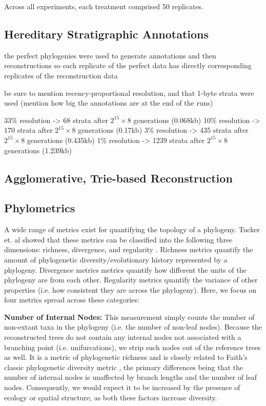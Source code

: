 Across all experiments, each treatment comprised 50 replicates.

\subsection{Hereditary Stratigraphic Annotations}

the perfect phylogenies were used to generate annotations and then reconstructions so each replicate of the perfect data has directly corresponding replicates of the reconstruction data

be sure to mention recency-proportional resolution, and that 1-byte strata were used (mention how big the annotations are at the end of the runs)

33\% resolution -> 68 strata after $2^{15} \times 8$ generations (0.068kb)
10\% resolution -> 170 strata after $2^{15} \times 8$ generations (0.17kb)
3\% resolution -> 435 strata after $2^{15} \times 8$ generations (0.435kb)
1\% resolution -> 1239 strata after $2^{15} \times 8$ generations (1.239kb)


\subsection{Agglomerative, Trie-based Reconstruction}

\subsection{Phylometrics}

A wide range of metrics exist for quantifying the topology of a phylogeny. Tucker et. al showed that these metrics can be classified into the following three dimensions: richness, divergence, and regularity \citep{tuckerGuidePhylogeneticMetrics2017}. 
Richness metrics quantify the amount of phylogenetic diversity/evolutionary history represented by a phylogeny. Divergence metrics metrics quantify how different the units of the phylogeny are from each other. Regularity metrics quantify the variance of other properties (i.e. how consistent they are across the phylogeny). Here, we focus on four metrics spread across these categories:

\textbf{Number of Internal Nodes:} This measurement simply counts the number of non-extant taxa in the phylogeny (i.e. the number of non-leaf nodes). Because the reconstructed trees do not contain any internal nodes not associated with a branching point (i.e. unifurcations), we strip such nodes out of the reference trees as well. It is a metric of phylogenetic richness and is closely related to Faith's classic phylogenetic diversity metric \citep{faithConservationEvaluationPhylogenetic1992}, the primary differences being that the number of internal nodes is unaffected by branch lengths and the number of leaf nodes. Consequently, we would expect it to be increased by the presence of ecology or spatial structure, as both these factors increase diversity.

